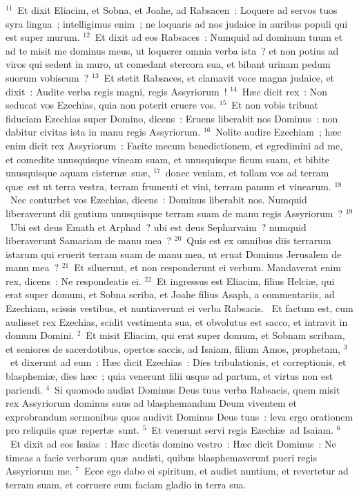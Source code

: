 ${}^{11}$~Et dixit Eliacim, et Sobna, et Joahe, ad Rabsacen~: Loquere ad servos tuos syra lingua~; intelligimus enim~; ne loquaris ad nos judaice in auribus populi qui est super murum.
${}^{12}$~Et dixit ad eos Rabsaces~: Numquid ad dominum tuum et ad te misit me dominus meus, ut loquerer omnia verba ista~? et non potius ad viros qui sedent in muro, ut comedant stercora sua, et bibant urinam pedum suorum vobiscum~?
${}^{13}$~Et stetit Rabsaces, et clamavit voce magna judaice, et dixit~: Audite verba regis magni, regis Assyriorum~!
${}^{14}$~H\ae c dicit rex~: Non seducat vos Ezechias, quia non poterit eruere vos.
${}^{15}$~Et non vobis tribuat fiduciam Ezechias super Domino, dicens~: Eruens liberabit nos Dominus~: non dabitur civitas ista in manu regis Assyriorum.
${}^{16}$~Nolite audire Ezechiam~; h\ae c enim dicit rex Assyriorum~: Facite mecum benedictionem, et egredimini ad me, et comedite unusquisque vineam suam, et unusquisque ficum suam, et bibite unusquisque aquam cistern\ae\ su\ae ,
${}^{17}$~donec veniam, et tollam vos ad terram qu\ae\ est ut terra vestra, terram frumenti et vini, terram panum et vinearum.
${}^{18}$~Nec conturbet vos Ezechias, dicens~: Dominus liberabit nos. Numquid liberaverunt dii gentium unusquisque terram suam de manu regis Assyriorum~?
${}^{19}$~Ubi est deus Emath et Arphad~? ubi est deus Sepharvaim~? numquid liberaverunt Samariam de manu mea~?
${}^{20}$~Quis est ex omnibus diis terrarum istarum qui eruerit terram suam de manu mea, ut eruat Dominus Jerusalem de manu mea~?
${}^{21}$~Et siluerunt, et non responderunt ei verbum. Mandaverat enim rex, dicens~: Ne respondeatis ei.
${}^{22}$~Et ingressus est Eliacim, filius Helci\ae , qui erat super domum, et Sobna scriba, et Joahe filius Asaph, a commentariis, ad Ezechiam, scissis vestibus, et nuntiaverunt ei verba Rabsacis.
~\lettrine[lines=10,image=true,loversize=0.05,lraise=-0.03]{E}{}t factum est, cum audisset rex Ezechias, scidit vestimenta sua, et obvolutus est sacco, et intravit in domum Domini.
${}^{2}$~Et misit Eliacim, qui erat super domum, et Sobnam scribam, et seniores de sacerdotibus, opertos saccis, ad Isaiam, filium Amos, prophetam,
${}^{3}$~et dixerunt ad eum~: H\ae c dicit Ezechias~: Dies tribulationis, et correptionis, et blasphemi\ae , dies h\ae c~; quia venerunt filii usque ad partum, et virtus non est pariendi.
${}^{4}$~Si quomodo audiat Dominus Deus tuus verba Rabsacis, quem misit rex Assyriorum dominus suus ad blasphemandum Deum viventem et exprobrandum sermonibus quos audivit Dominus Deus tuus~: leva ergo orationem pro reliquiis qu\ae\ repert\ae\ sunt.
${}^{5}$~Et venerunt servi regis Ezechi\ae\ ad Isaiam.
${}^{6}$~Et dixit ad eos Isaias~: H\ae c dicetis domino vestro~: H\ae c dicit Dominus~: Ne timeas a facie verborum qu\ae\ audisti, quibus blasphemaverunt pueri regis Assyriorum me.
${}^{7}$~Ecce ego dabo ei spiritum, et audiet nuntium, et revertetur ad terram suam, et corruere eum faciam gladio in terra sua.


